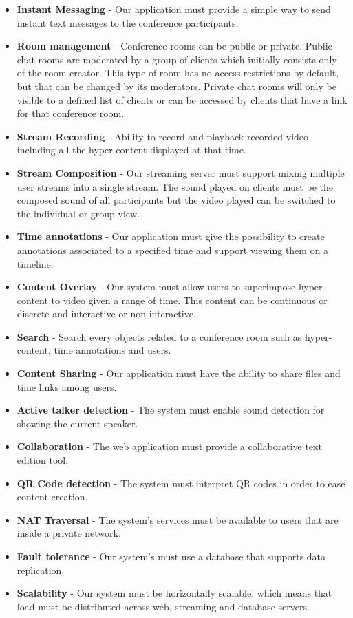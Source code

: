 \begin{itemize}
 \item \textbf{Instant Messaging} - Our application must provide a simple way to send instant text messages to the conference participants.
 \item \textbf{Room management} - Conference rooms can be public or private. Public chat rooms are moderated by a group of clients which initially consists only of the room creator. This type of room has no access restrictions by default, but that can be changed by its moderators. Private chat rooms will only be visible to a defined list of clients or can be accessed by clients that have a link for that conference room.
 \item \textbf{Stream Recording} - Ability to record and playback recorded video including all the hyper-content displayed at that time.
 \item \textbf{Stream Composition} - Our streaming server must support mixing multiple user streams into a single stream. The sound played on clients must be the composed sound of all participants but the video played can be switched to the individual or group view.
 \item \textbf{Time annotations} - Our application must give the possibility to create annotations associated to a specified time and support viewing them on a timeline. 
 \item \textbf{Content Overlay} - Our system must allow users to superimpose hyper-content to video given a range of time. This content can be continuous or discrete and interactive or non interactive.
 \item \textbf{Search} - Search every objects related to a conference room such as hyper-content, time annotations and users.
 \item \textbf{Content Sharing} - Our application must have the ability to share files and time links among users.
 \item \textbf{Active talker detection} - The system must enable sound detection for showing the current speaker.
 \item \textbf{Collaboration} - The web application must provide a collaborative text edition tool.
 \item \textbf{QR Code detection} - The system must interpret \ac{QR} codes in order to ease content creation.
 \item \textbf{NAT Traversal} - The system's services must be available to users that are inside a private network.
 \item \textbf{Fault tolerance} - Our system's must use a database that supports data replication.
 \item \textbf{Scalability} - Our system must be horizontally scalable, which means that load must be distributed across web, streaming and database servers.
\end{itemize}

